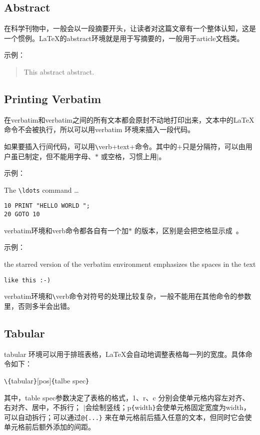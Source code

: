 \documentclass[UTF8]{ctexart}
\begin{document}
\subsection{Abstract}
\qquad 在科学刊物中，一般会以一段摘要开头，让读者对这篇文章有一个整体认知，这是一个惯例。\LaTeX 的abstract环境就是用于写摘要的，一般用于article文档类。

示例：
\begin{abstract}
This abstract abstract.
\end{abstract}

\subsection{Printing Verbatim}
\qquad 在verbatim和verbatim之间的所有文本都会原封不动地打印出来，文本中的\LaTeX 命令不会被执行，所以可以用verbatim 环境来插入一段代码。

\qquad 如果要插入行间代码，可以用\texttt{\textbackslash}verb+text+命令。其中的+只是分隔符，可以由用户虽已制定，但不能用字母、$\ast$ 或空格，习惯上用$\mid$。

示例：

The \verb|\ldots| command \ldots

\begin{verbatim}
10 PRINT "HELLO WORLD ";
20 GOTO 10
\end{verbatim}

verbatim环境和verb命令都各自有一个加$\ast$ 的版本，区别是会把空格显示成\verb*| |。

示例：

\begin{verbatim*}
the starred version of
the       verbatim
environment emphasizes
the spaces   in the text
\end{verbatim*}

\verb*|like this :-) |

verbatim环境和\texttt{\textbackslash}verb命令对符号的处理比较复杂，一般不能用在其他命令的参数里，否则多半会出错。
\subsection{Tabular}
\qquad tabular 环境可以用于排班表格，\LaTeX 会自动地调整表格每一列的宽度。具体命令如下：

\qquad \texttt{\textbackslash}\texttt{\{}tabular\texttt{\}}[pos]\texttt{\{}talbe spec\texttt{\}}

\qquad 其中，table spec参数决定了表格的格式，1、r、c 分别会使单元格内容左对齐、右对齐、居中，不拆行；
$\mid$会绘制竖线；p\texttt{\{}width\texttt{\}}会使单元格固定宽度为width，可以自动拆行；可以通过\texttt{@\{...\}}
来在单元格前后插入任意的文本，但同时它会使单元格前后额外添加的间距。
\end{document}

